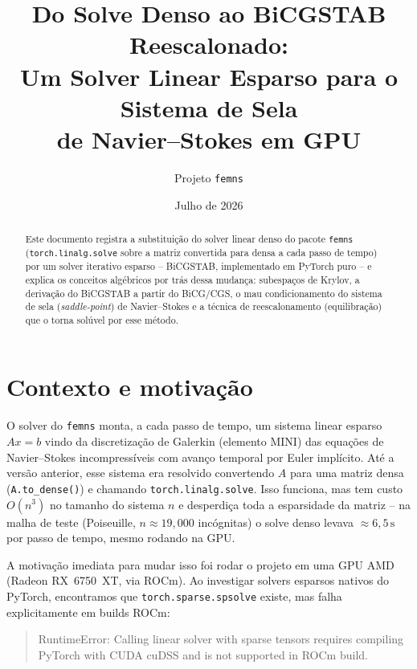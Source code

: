 \documentclass[11pt,a4paper]{article}
\title{Do Solve Denso ao BiCGSTAB Reescalonado:\\
Um Solver Linear Esparso para o Sistema de Sela\\
de Navier--Stokes em GPU}
\author{Projeto \texttt{femns}}
\date{Julho de 2026}
\begin{document}
\maketitle

\begin{abstract}
Este documento registra a substituição do solver linear denso do
pacote \texttt{femns} (\texttt{torch.linalg.solve} sobre a matriz
convertida para densa a cada passo de tempo) por um solver iterativo
esparso -- BiCGSTAB, implementado em PyTorch puro -- e explica os
conceitos algébricos por trás dessa mudança: subespaços de Krylov, a
derivação do BiCGSTAB a partir do BiCG/CGS, o mau condicionamento do
sistema de sela (\emph{saddle-point}) de Navier--Stokes e a técnica de
reescalonamento (equilibração) que o torna solúvel por esse método.
\end{abstract}

\tableofcontents

\section{Contexto e motivação}

O solver do \texttt{femns} monta, a cada passo de tempo, um sistema
linear esparso $Ax=b$ vindo da discretização de Galerkin (elemento
MINI) das equações de Navier--Stokes incompressíveis com avanço
temporal por Euler implícito. Até a versão anterior, esse sistema era
resolvido convertendo $A$ para uma matriz densa
(\texttt{A.to\_dense()}) e chamando \texttt{torch.linalg.solve}. Isso
funciona, mas tem custo $O(n^3)$ no tamanho do sistema $n$ e desperdiça
toda a esparsidade da matriz -- na malha de teste (Poiseuille,
$n\approx 19{,}000$ incógnitas) o solve denso levava
${\approx}6{,}5\,\text{s}$ por passo de tempo, mesmo rodando na GPU.

A motivação imediata para mudar isso foi rodar o projeto em uma GPU
AMD (Radeon RX~6750~XT, via ROCm). Ao investigar solvers esparsos
nativos do PyTorch, encontramos que \texttt{torch.sparse.spsolve}
existe, mas falha explicitamente em builds ROCm:

\begin{quote}
\ttfamily\small
RuntimeError: Calling linear solver with sparse tensors requires
compiling PyTorch with CUDA cuDSS and is not supported in ROCm build.
\end{quote}
\end{document}

